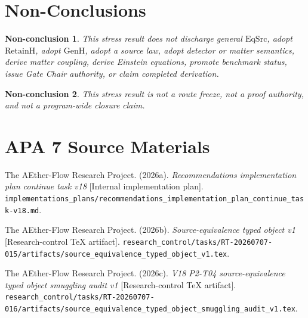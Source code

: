 \documentclass[11pt]{article}
\newcommand{\EqSrc}{\mathrm{EqSrc}}
\newcommand{\RetainH}{\mathrm{RetainH}}
\newcommand{\GenH}{\mathrm{GenH}}
\newtheorem{nonconclusion}{Non-conclusion}
\begin{document}
\section{Non-Conclusions}

\begin{nonconclusion}
This stress result does not discharge general \(\EqSrc\), adopt \(\RetainH\),
adopt \(\GenH\), adopt a source law, adopt detector or matter semantics,
derive matter coupling, derive Einstein equations, promote benchmark status,
issue Gate Chair authority, or claim completed derivation.
\end{nonconclusion}

\begin{nonconclusion}
This stress result is not a route freeze, not a proof authority, and not a
program-wide closure claim.
\end{nonconclusion}

\section{APA 7 Source Materials}

The AEther-Flow Research Project. (2026a). \emph{Recommendations
implementation plan continue task v18} [Internal implementation plan].
\texttt{implementations\_plans/recommendations\_implementation\_plan\_continue\_task-v18.md}.

The AEther-Flow Research Project. (2026b). \emph{Source-equivalence typed
object v1} [Research-control TeX artifact].
\texttt{research\_control/tasks/RT-20260707-015/artifacts/source\_equivalence\_typed\_object\_v1.tex}.

The AEther-Flow Research Project. (2026c). \emph{V18 P2-T04 source-equivalence
typed object smuggling audit v1} [Research-control TeX artifact].
\texttt{research\_control/tasks/RT-20260707-016/artifacts/source\_equivalence\_typed\_object\_smuggling\_audit\_v1.tex}.
\end{document}
